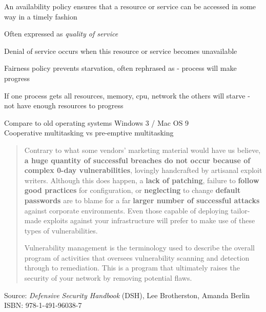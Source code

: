 \documentclass[Screen16to9,17pt]{foils}
\begin{document}

\begin{list1}
\item An availability policy ensures that a resource or service can be accessed in some way in a timely fashion
\item Often expressed as \emph{quality of service}
\item Denial of service occurs when this resource or service becomes unavailable
\end{list1}



\begin{list1}
\item Fairness policy prevents starvation, often rephrased as - process will make progress
\item If one process gets all resources, memory, cpu, network the others will starve - not have enough resources to progress
\item Compare to old operating systems Windows 3 / Mac OS 9\\
Cooperative multitasking vs pre-emptive multitasking
\end{list1}




\begin{quote}\small
Contrary to what some vendors’ marketing material would have us believe, {\bf a huge quantity of successful breaches do not occur because of complex 0-day vulnerabilities}, lovingly handcrafted by artisanal exploit writers. Although this does happen, a {\bf lack of patching}, failure to {\bf follow good practices} for configuration, or {\bf neglecting} to change {\bf default passwords} are to blame for a far {\bf larger number of successful attacks} against corporate environments. Even those capable of deploying tailor-made exploits against your infrastructure will prefer to make use of these types of vulnerabilities.

Vulnerability management is the terminology used to describe the overall program of activities that oversees vulnerability scanning and detection through to remediation. This is a program that ultimately raises the security of your network by removing potential flaws.

\end{quote}
Source: \emph{Defensive Security Handbook} (DSH), Lee Brotherston, Amanda Berlin
ISBN: 978-1-491-96038-7
\end{document}
